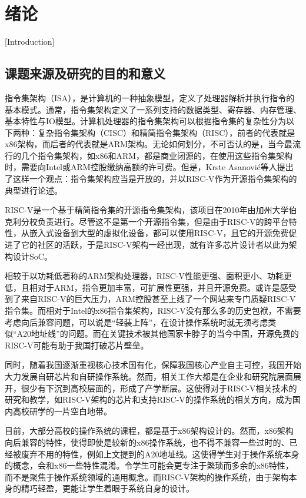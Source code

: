 
\chapter{绪论}[Introduction]

\section{课题来源及研究的目的和意义}

指令集架构（ISA），是计算机的一种抽象模型，定义了处理器解析并执行指令的基本模式。通常，指令集架构定义了一系列支持的数据类型、寄存器、内存管理、基本特性与IO模型。计算机处理器的指令集架构可以根据指令集的复杂性分为以下两种：复杂指令集架构（CISC）和精简指令集架构（RISC），前者的代表就是x86架构，而后者的代表就是ARM架构\cite{DBLP:conf/hpca/BlemMS13}。无论如何划分，不可否认的是，当今最流行的几个指令集架构，如x86和ARM，都是商业闭源的，在使用这些指令集架构时，需要向Intel或ARM控股缴纳高额的许可费。但是，Krste Asanović等人提出了这样一个观点：指令集架构应当是开放的\cite{Asanović:EECS-2014-146}，并以RISC-V作为开源指令集架构的典型进行论述。

RISC-V是一个基于精简指令集的开源指令集架构，该项目在2010年由加州大学伯克利分校负责进行。尽管这不是第一个开源指令集，但是由于RISC-V的跨平台特性，从嵌入式设备到大型的虚拟化设备，都可以使用RISC-V，且它的开源免费促进了它的社区的活跃，于是RISC-V架构一经出现，就有许多芯片设计者以此为架构设计SoC\cite{DBLP:conf/asap/FlamandR0LPRB18}\cite{DBLP:journals/jssc/KellerCZKPLBBCD17}\cite{7436635}。

相较于以功耗低著称的ARM架构处理器，RISC-V性能更强、面积更小、功耗更低\cite{A45nm1.3GHz}，且相对于ARM，指令更加丰富，可扩展性更强，并且开源免费。或许是感受到了来自RISC-V的巨大压力，ARM控股甚至上线了一个网站来专门质疑RISC-V指令集。而相对于Intel的x86指令集架构，RISC-V没有那么多的历史包袱，不需要考虑向后兼容问题\cite{DBLP:conf/hpca/BlemMS13}，可以说是“轻装上阵”，在设计操作系统时就无须考虑类似“A20地址线”的问题。而在关键技术被其他国家卡脖子的当今中国，开源免费的RISC-V可能有助于我国打破芯片壁垒。

同时，随着我国逐渐重视核心技术国有化，保障我国核心产业自主可控，我国开始大力发展自研芯片和自研操作系统\cite{王莹2019中国工程院院士}。然而，相关工作大都是在企业和研究院层面展开，很少有下沉到高校层面的\cite{程知2020基于}\cite{张军2020基于}，形成了产学断层。这使得对于RISC-V相关技术的研究和教学，如RISC-V架构的芯片和支持RISC-V的操作系统的相关方向，成为国内高校研学的一片空白地带。

目前，大部分高校的操作系统的课程，都是基于x86架构设计的。然而，x86架构向后兼容的特性，使得即使是较新的x86操作系统，也不得不兼容一些过时的、已经被废弃不用的特性，例如上文提到的A20地址线。这使得学生对于操作系统本身的概念，会和x86一些特性混淆。令学生可能会更专注于繁琐而多余的x86特性，而不是聚焦于操作系统领域的通用概念。而RISC-V架构的操作系统，由于架构本身的精巧轻盈，更能让学生着眼于系统自身的设计\cite{greengard2020will}。

